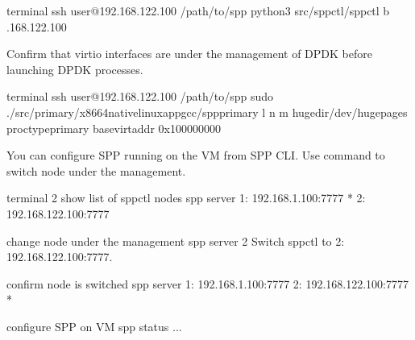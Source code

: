 \documentclass[a4paper,11pt,openany,oneside,english]{sphinxmanual}
\begin{document}
\begin{sphinxVerbatim}[commandchars=\\\{\},formatcom=\footnotesize]
 terminal 
 ssh user@192.168.122.100
  /path/to/spp
 python3 src/spp\PYGZhy{}ctl/spp\PYGZhy{}ctl \PYGZhy{}b .168.122.100
\end{sphinxVerbatim}

Confirm that virtio interfaces are under the management of DPDK before
launching DPDK processes.

\begin{sphinxVerbatim}[commandchars=\\\{\},formatcom=\footnotesize]
 terminal 
 ssh user@192.168.122.100
  /path/to/spp
 sudo ./src/primary/x86\PYGZus{}64\PYGZhy{}native\PYGZhy{}linuxapp\PYGZhy{}gcc/spp\PYGZus{}primary 
    \PYGZhy{}l  \PYGZhy{}n  
    \PYGZhy{}m  
    \PYGZhy{}\PYGZhy{}huge\PYGZhy{}dir/dev/hugepages 
    \PYGZhy{}\PYGZhy{}proc\PYGZhy{}typeprimary 
    \PYGZhy{}\PYGZhy{}base\PYGZhy{}virtaddr 0x100000000
\end{sphinxVerbatim}

You can configure SPP running on the VM from SPP CLI.
Use  command to switch node under the management.

\begin{sphinxVerbatim}[commandchars=\\\{\},formatcom=\footnotesize]
\PYGZsh{} terminal 2
\PYGZsh{} show list of spp\PYGZhy{}ctl nodes
spp \PYGZgt{} server
1: 192.168.1.100:7777 *
2: 192.168.122.100:7777

\PYGZsh{} change node under the management
spp \PYGZgt{} server 2
Switch spp\PYGZhy{}ctl to \PYGZdq{}2: 192.168.122.100:7777\PYGZdq{}.

\PYGZsh{} confirm node is switched
spp \PYGZgt{} server
1: 192.168.1.100:7777
2: 192.168.122.100:7777 *

\PYGZsh{} configure SPP on VM
spp \PYGZgt{} status
...
\end{sphinxVerbatim}
\end{document}
